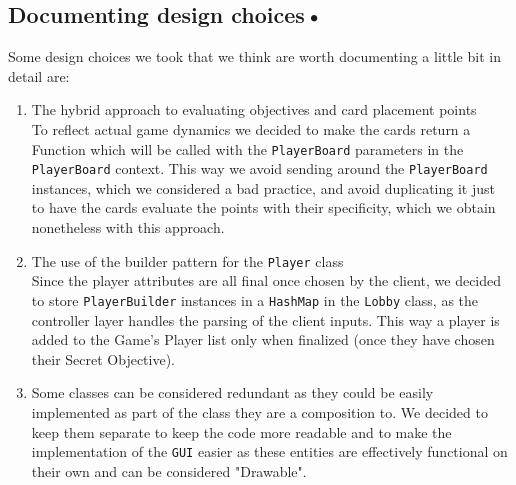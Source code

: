 \documentclass[12pt]{article}
\begin{document}
\subsection{Documenting design choices•}
Some design choices we took that we think are worth documenting a little bit in detail are:
\begin{enumerate}
\item The hybrid approach to evaluating objectives and card placement points\vspace{0.1cm}\\  To reflect actual game dynamics we decided to make the cards return a Function which will be called with the \texttt{PlayerBoard} parameters in the \texttt{PlayerBoard} context. This way we avoid sending around the \texttt{PlayerBoard} instances, which we considered a bad practice, and avoid duplicating it just to have the cards evaluate the points with their specificity, which we obtain nonetheless with this approach.      

\item The use of the builder pattern for the \texttt{Player} class\vspace{0.10cm}\\  Since the player attributes are all final once chosen by the client, we decided to store \texttt{PlayerBuilder} instances in a \texttt{HashMap} in the \texttt{Lobby} class, as the controller layer handles the parsing of the client inputs. This way a player is added to the Game's Player list only when finalized (once they have chosen their Secret Objective).

\item Some classes can be considered redundant as they could be easily implemented as part of the class they are a composition to. We decided to keep them separate to keep the code more readable and to make the implementation of the \texttt{GUI} easier as these entities are effectively functional on their own and can be considered "Drawable". 
\end{enumerate}
\end{document}
